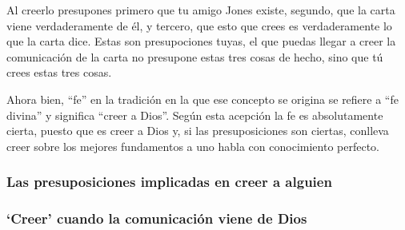 Al creerlo presupones primero que tu amigo Jones existe, segundo, que la carta viene verdaderamente de él, y tercero, que esto que crees es verdaderamente lo que la carta dice. Estas son presupociones tuyas, el que puedas llegar a creer la comunicación de la carta no presupone estas tres cosas de hecho, sino que tú crees estas tres cosas.

Ahora bien, ``fe'' en la tradición en la que ese concepto se origina se refiere a ``fe divina'' y significa ``creer a Dios''. Según esta acepción la fe es absolutamente cierta, puesto que es creer a Dios y, si las presuposiciones son ciertas, conlleva creer sobre los mejores fundamentos a uno habla con conocimiento perfecto.

\subsubsection{Las presuposiciones implicadas en creer a alguien}

\subsubsection{`Creer' cuando la comunicación viene de Dios}

